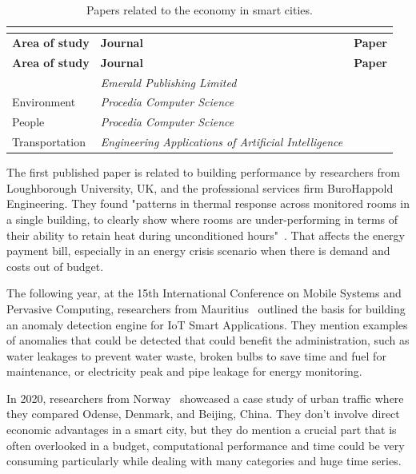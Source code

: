 \documentclass[a4paper,12pt,twoside]{ThesisStyle}
\begin{document}
\renewcommand{\arraystretch}{1.5}
\begin{longtable}{  l  l  l }
\caption{Papers related to the economy in smart cities.}  \\
\label{taula:PEconomy}  \\
\hline
  \textbf{Area of study} & \textbf{Journal} & \textbf{Paper} \\
\hline 
\endfirsthead
 \hline
  \textbf{Area of study} & \textbf{Journal} & \textbf{Paper} \\
\hline 
\endhead
\hline
\endfoot
\multirow{1}{*}{Energy} & \textit{Emerald Publishing Limited} &  ~\cite{gerrish2017analysis}  \\
 \hline 
 \multirow{1}{*}{Environment} & \textit{Procedia Computer Science} &  ~\cite{mohamudally2018building}  \\
\hline 
\multirow{1}{*}{People} &  \textit{Procedia Computer Science} &  ~\cite{embarak2021new} \\
\hline 
\multirow{1}{*}{Transportation} &\parbox{5cm}{\textit{Engineering Applications of Artificial Intelligence}} &  ~\cite{belhadi2020space}  \\
\end{longtable}

The first published paper is related to building performance by researchers from Loughborough University, UK, and the professional services firm BuroHappold Engineering. They found "patterns in thermal response across monitored rooms in a single building, to clearly show where rooms are under-performing in terms of their ability to retain heat during unconditioned hours"~\cite{gerrish2017analysis}. That affects the energy payment bill, especially in an energy crisis scenario when there is demand and costs out of budget.

The following year, at the 15th International Conference on Mobile Systems and Pervasive Computing, researchers from Mauritius~\cite{mohamudally2018building} outlined the basis for building an anomaly detection engine for IoT Smart Applications. They mention examples of anomalies that could be detected that could benefit the administration, such as water leakages to prevent water waste, broken bulbs to save time and fuel for maintenance, or electricity peak and pipe leakage for energy monitoring.

In 2020, researchers from Norway~\cite{belhadi2020space} showcased a case study of urban traffic where they compared Odense, Denmark, and Beijing, China. They don't involve direct economic advantages in a smart city, but they do mention a crucial part that is often overlooked in a budget, computational performance and time could be very consuming particularly while dealing with many categories and huge time series. 
\end{document}
